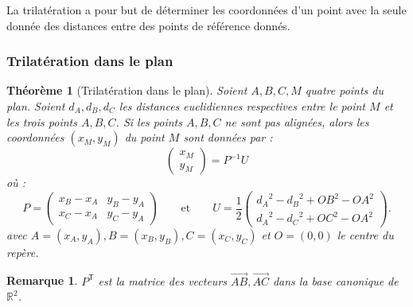 \documentclass[french, a4paper, 12pt, parskip]{scrartcl}
\newtheorem{theorem}{Théorème}
\newtheorem*{remark}{Remarque}
\begin{document}
La trilatération a pour but de déterminer les coordonnées d'un point avec la
seule donnée des distances entre des points de référence donnés.

\subsubsection{Trilatération dans le plan}

\begin{theorem}[Trilatération dans le plan]
  \label{th:trilat-plan}
  Soient $A, B, C, M$ quatre points du plan. Soient $d_A, d_B, d_C$ les
  distances euclidiennes respectives entre le point $M$ et les trois points $A,
  B, C$. Si les points $A, B, C$ ne sont pas alignées, alors les coordonnées
  $(x_M, y_M)$ du point $M$ sont données par :
  \[
    \begin{pmatrix}x_M\\y_M\end{pmatrix} = P^{-1}U 
  \]
  où :
  \[
    P = \begin{pmatrix}
      x_B-x_A & y_B-y_A \\
      x_C-x_A & y_C-y_A
    \end{pmatrix}\qquad\text{et}\qquad U=\frac{1}{2}\begin{pmatrix}
      {d_A}^2 - {d_B}^2 + {OB}^2 - {OA}^2 \\ 
      {d_A}^2 - {d_C}^2 + {OC}^2 - {OA}^2
    \end{pmatrix}.
  \]
  avec $A=(x_A, y_A), B=(x_B, y_B), C=(x_C, y_C)$ et $O=(0, 0)$ le centre du
  repère.
\end{theorem}

\begin{remark}
  $P^{\mathsf{T}}$ est la matrice des vecteurs $\overrightarrow{AB},
  \overrightarrow{AC}$ dans la base canonique de $\mathbb{R}^2$.
\end{remark}
\end{document}
